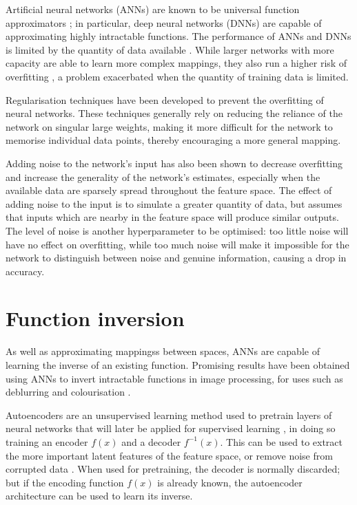 \documentclass[../../main.tex]{subfiles}
\begin{document}
Artificial neural networks (ANNs) are known to be universal function approximators \cite{hornik91}; in particular, deep neural networks (DNNs) \cite{liang17} are capable of approximating highly intractable functions.
The performance of ANNs and DNNs is limited by the quantity of data available \cite{raudys91}.
While larger networks with more capacity are able to learn more complex mappings, they also run a higher risk of overfitting \cite{caruana01}, a problem exacerbated when the quantity of training data is limited.

Regularisation techniques have been developed \cite{goodfellow16, srivastava14, ioffe15, li18} to prevent the overfitting of neural networks.
These techniques generally rely on reducing the reliance of the network on singular large weights, making it more difficult for the network to memorise individual data points, thereby encouraging a more general mapping.

Adding noise to the network's input \cite{zur09} has also been shown to decrease overfitting and increase the generality of the network's estimates, especially when the available data are sparsely spread throughout the feature space.
The effect of adding noise to the input is to simulate a greater quantity of data, but assumes that inputs which are nearby in the feature space will produce similar outputs.
The level of noise is another hyperparameter to be optimised: too little noise will have no effect on overfitting, while too much noise will make it impossible for the network to distinguish between noise and genuine information, causing a drop in accuracy.

\section{Function inversion} \label{section:functionInversion}

As well as approximating mappingss between spaces, ANNs are capable of learning the inverse of an existing function.
Promising results have been obtained using ANNs to invert intractable functions in image processing, for uses such as deblurring \cite{nah18} and colourisation \cite{nguyen16}.

Autoencoders are an unsupervised learning method used to pretrain layers of neural networks that will later be applied for supervised learning \cite{rumelhart86}, in doing so training an encoder $f(x)$ and a decoder $f^{-1}(x)$.
This can be used to extract the more important latent features of the feature space, or remove noise from corrupted data \cite{vincent08}.
When used for pretraining, the decoder is normally discarded; but if the encoding function $f(x)$ is already known, the autoencoder architecture can be used to learn its inverse.
\end{document}
